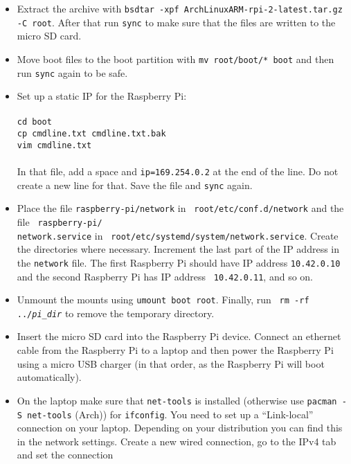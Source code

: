 \documentclass{article}
\newcommand{\arch}{{\color{red} (Arch)}}
\begin{document}
\begin{itemize}
    \item Extract the archive with {\tt bsdtar -xpf 
          ArchLinuxARM-rpi-2-latest.tar.gz -C root}.
          After that run {\tt sync} to make sure that the files are written to 
          the micro SD card.
    \item Move boot files to the boot partition with {\tt mv root/boot/* boot} 
          and then run {\tt sync} again to be safe.
    \item Set up a static IP for the Raspberry Pi: \\\\
          {\tt cd boot} \\
          {\tt cp cmdline.txt cmdline.txt.bak} \\
          {\tt vim cmdline.txt} \\\\
          In that file, add a space and {\tt ip=169.254.0.2} at the end of the 
          line. Do not create a new line for that. Save the file and {\tt sync} 
          again.
    \item Place the file {\tt raspberry-pi/network} in {\tt 
          root/etc/conf.d/network} and the file {\tt 
          raspberry-pi/\\network.service} in {\tt 
          root/etc/systemd/system/network.service}. Create the directories 
          where necessary. Increment the last part of the IP address in the 
          {\tt network} file. The first Raspberry Pi should have IP address 
          {\tt 10.42.0.10} and the second Raspberry Pi has IP address {\tt 
          10.42.0.11}, and so on.
    \item Unmount the mounts using {\tt umount boot root}. Finally, run {\tt 
          rm -rf ../\emph{pi\_dir}} to remove the temporary directory.
    \item Insert the micro SD card into the Raspberry Pi device. Connect an 
          ethernet cable from the Raspberry Pi to a laptop and then power the 
          Raspberry Pi using a micro USB charger (in that order, as the 
          Raspberry Pi will boot automatically).
    \item On the laptop make sure that {\tt net-tools} is installed (otherwise 
          use {\tt pacman -S net-tools} \arch{}) for {\tt ifconfig}. You need 
          to set up a ``Link-local'' connection on your laptop. Depending on 
          your distribution you can find this in the network settings. Create 
          a new wired connection, go to the IPv4 tab and set the connection 

\end{itemize}
\end{document}

